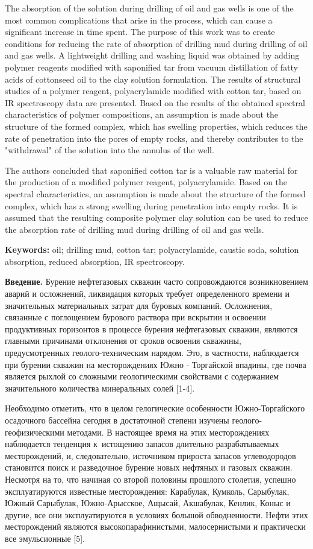 The absorption of the solution during drilling of oil and gas wells is
one of the most common complications that arise in the process, which
can cause a significant increase in time spent. The purpose of this work
was to create conditions for reducing the rate of absorption of drilling
mud during drilling of oil and gas wells. A lightweight drilling and
washing liquid was obtained by adding polymer reagents modified with
saponified tar from vacuum distillation of fatty acids of cottonseed oil
to the clay solution formulation. The results of structural studies of a
polymer reagent, polyacrylamide modified with cotton tar, based on IR
spectroscopy data are presented. Based on the results of the obtained
spectral characteristics of polymer compositions, an assumption is made
about the structure of the formed complex, which has swelling
properties, which reduces the rate of penetration into the pores of
empty rocks, and thereby contributes to the "withdrawal" of the solution
into the annulus of the well.

The authors concluded that saponified cotton tar is a valuable raw
material for the production of a modified polymer reagent,
polyacrylamide. Based on the spectral characteristics, an assumption is
made about the structure of the formed complex, which has a strong
swelling during penetration into empty rocks. It is assumed that the
resulting composite polymer clay solution can be used to reduce the
absorption rate of drilling mud during drilling of oil and gas wells.

{\bfseries Keywords:} oil; drilling mud, cotton tar; polyacrylamide,
caustic soda, solution absorption, reduced absorption, IR spectroscopy.

{\bfseries Введение.} Бурение нефтегазовых скважин часто сопровождаются
возникновением аварий и осложнений, ликвидация которых требует
определенного времени и значительных материальных затрат для буровых
компаний. Осложнения, связанные с поглощением бурового раствора при
вскрытии и освоении продуктивных горизонтов в процессе бурения
нефтегазовых скважин, являются главными причинами отклонения от сроков
освоения скважины, предусмотренных геолого-техническим нарядом. Это, в
частности, наблюдается при бурении скважин на месторождениях Южно -
Торгайской впадины, где почва является рыхлой со сложными геологическими
свойствами с содержанием значительного количества минеральных солей
{[}1-4{]}.

Необходимо отметить, что в целом гелогические особенности
Южно-Торгайского осадочного бассейна сегодня в достаточной степени
изучены геолого-геофизическими методами. В настоящее время на этих
месторождениях наблюдается тенденция к~истощению запасов длительно
разрабатываемых месторождений, и, следовательно, источником прироста
запасов углеводородов становится поиск и разведочное бурение новых
нефтяных и газовых скважин. Несмотря на то, что начиная со второй
половины прошлого столетия, успешно эксплуатируются известные
месторождения: Карабулак, Кумколь, Сарыбулак, Южный Сарыбулак,
Южно-Арысское, Ащысай, Акшабулак, Кенлик, Коныс и другие, все они
эксплуатируются в условиях большой обводненности. Нефти этих
месторождений являются высокопарафинистыми, малосернистыми и практически
все эмульсионные {[}5{]}.

